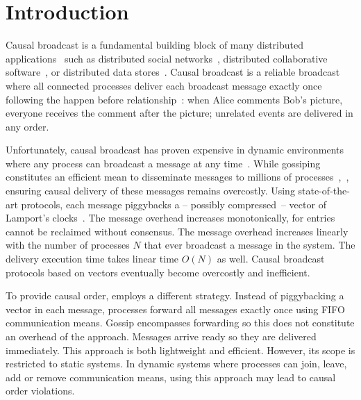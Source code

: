 
\section{Introduction}

Causal broadcast is a fundamental building block of many distributed
applications~\cite{nakamoto2009bitcoin} such
as distributed social networks~\cite{borthakur2013petabyte},
distributed collaborative
software~\cite{nedelec2016crate,heinrich2012exploiting}, or distributed
data
stores~\cite{demers1987epidemic,shapiro2011comprehensive,bailis2013bolton,lloyd2011cops,bravo2017saturn}.
Causal broadcast is a reliable broadcast where all connected processes
deliver each broadcast message exactly once following the happen
before relationship~\cite{lamport1978time,schwarz1994detecting}: when
Alice comments Bob's picture, everyone receives the comment after the
picture; unrelated events are delivered in any order.

Unfortunately, causal broadcast has proven expensive in dynamic environments
where any process can broadcast a message at any
time~\cite{charronbost1991concerning}. While gossiping constitutes an efficient
mean to disseminate messages to millions of
processes~\cite{demers1987epidemic},~\cite{birman1999bimodal}, ensuring causal
delivery of these messages remains overcostly.  Using state-of-the-art
protocols, each message piggybacks a -- possibly compressed~-- vector of
Lamport's
clocks~\cite{almeida2008interval,fidge1988timestamps,mattern1989virtual,singhal1992efficient}.
The message overhead increases monotonically, for entries cannot be reclaimed
without consensus. The message overhead increases linearly with the number of
processes $N$ that ever broadcast a message in the system.  The delivery
execution time takes linear time $O(N)$ as well. Causal broadcast protocols
based on vectors eventually become overcostly and inefficient.


To provide causal order, \cite{friedman2004causal} employs a different
strategy. Instead of piggybacking a vector in each message, processes forward
all messages exactly once using FIFO communication means. Gossip encompasses
forwarding so this does not constitute an overhead of the approach.  Messages
arrive ready so they are delivered immediately. This approach is both
lightweight and efficient. However, its scope is restricted to static systems.
In dynamic systems where processes can join, leave, add or remove communication
means, using this approach may lead to causal order violations.


